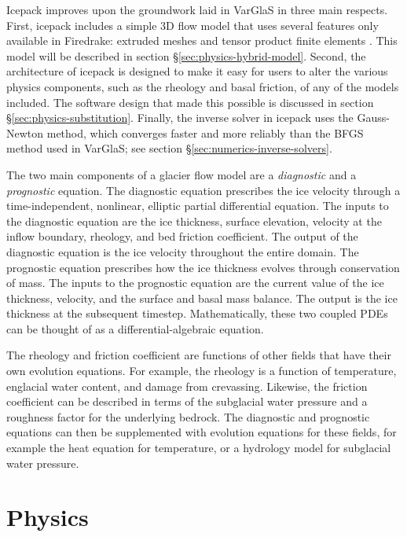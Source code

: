 \documentclass{article}
\theoremstyle{definition}
\theoremstyle{plain}
\begin{document}
Icepack improves upon the groundwork laid in VarGlaS in three main respects.
First, icepack includes a simple 3D flow model that uses several features only available in Firedrake: extruded meshes and tensor product finite elements \citep{bercea2016structure, mcrae2016automated}.
This model will be described in section \S\ref{sec:physics-hybrid-model}.
Second, the architecture of icepack is designed to make it easy for users to alter the various physics components, such as the rheology and basal friction, of any of the models included.
The software design that made this possible is discussed in section \S\ref{sec:physics-substitution}.
Finally, the inverse solver in icepack uses the Gauss-Newton method, which converges faster and more reliably than the BFGS method used in VarGlaS; see section \S\ref{sec:numerics-inverse-solvers}.

The two main components of a glacier flow model are a \emph{diagnostic} and a \emph{prognostic} equation.
The diagnostic equation prescribes the ice velocity through a time-independent, nonlinear, elliptic partial differential equation.
The inputs to the diagnostic equation are the ice thickness, surface elevation, velocity at the inflow boundary, rheology, and bed friction coefficient.
The output of the diagnostic equation is the ice velocity throughout the entire domain.
The prognostic equation prescribes how the ice thickness evolves through conservation of mass.
The inputs to the prognostic equation are the current value of the ice thickness, velocity, and the surface and basal mass balance.
The output is the ice thickness at the subsequent timestep.
Mathematically, these two coupled PDEs can be thought of as a differential-algebraic equation.

The rheology and friction coefficient are functions of other fields that have their own evolution equations.
For example, the rheology is a function of temperature, englacial water content, and damage from crevassing.
Likewise, the friction coefficient can be described in terms of the subglacial water pressure and a roughness factor for the underlying bedrock.
The diagnostic and prognostic equations can then be supplemented with evolution equations for these fields, for example the heat equation for temperature, or a hydrology model for subglacial water pressure.


\section{Physics}
\end{document}
